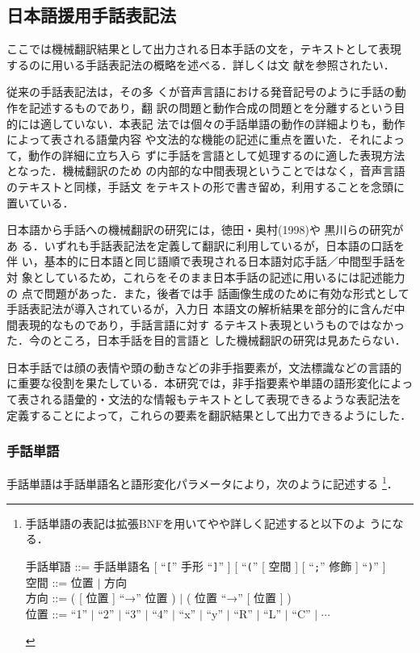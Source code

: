 \documentclass[japanese]{jnlp_1.4}
\begin{document}
\subsection{日本語援用手話表記法}
\label{sec:notation}

ここでは機械翻訳結果として出力される日本手話の文を，テキストとして表現
するのに用いる手話表記法の概略を述べる．詳しくは文
献\cite{Matsumoto2006}を参照されたい．

従来の手話表記法\cite{Prillwitz2004,Sutton2002,Ichikawa2001}は，その多
くが音声言語における発音記号のように手話の動作を記述するものであり，翻
訳の問題と動作合成の問題とを分離するという目的には適していない．本表記
法では個々の手話単語の動作の詳細よりも，動作によって表される語彙内容
や文法的な機能の記述に重点を置いた．それによって，動作の詳細に立ち入ら
ずに手話を言語として処理するのに適した表現方法となった．機械翻訳のため
の内部的な中間表現ということではなく，音声言語のテキストと同様，手話文
をテキストの形で書き留め，利用することを念頭に置いている．

日本語から手話への機械翻訳の研究には，徳田・奥村(1998)\nocite{Tokuda1998}や
黒川ら\cite{Fujishige1997,Hirata2003,Ikeda2003,Miyashita2004}の研究があ
る．いずれも手話表記法を定義して翻訳に利用しているが，日本語の口話を伴
い，基本的に日本語と同じ語順で表現される日本語対応手話／中間型手話を対
象としているため，これらをそのまま日本手話の記述に用いるには記述能力の
点で問題があった\cite{Matsumoto2006}．また，後者\cite{Ikeda2003}では手
話画像生成のために有効な形式として手話表記法が導入されているが，入力日
本語文の解析結果を部分的に含んだ中間表現的なものであり，手話言語に対す
るテキスト表現というものではなかった．今のところ，日本手話を目的言語と
した機械翻訳の研究は見あたらない．

日本手話では顔の表情や頭の動きなどの非手指要素が，文法標識などの言語的
に重要な役割を果たしている．本研究では，非手指要素や単語の語形変化によっ
て表される語彙的・文法的な情報もテキストとして表現できるような表記法を
定義することによって，これらの要素を翻訳結果として出力できるようにした．



\subsubsection{手話単語}

手話単語は手話単語名と語形変化パラメータにより，次のように記述する
\footnote{手話単語の表記は拡張BNFを用いてやや詳しく記述すると以下のよ
  うになる．
   \\
  \begin{minipage}{1.0\linewidth}
\begin{tabbing}
\qquad\qquad  手話\=単語 ::= 手話単語名 [ ``\texttt{[}'' 手形 ``\texttt{]}'' ] [
``\texttt{(}'' [ 空間 ] [ ``\texttt{;}'' 修飾 ] ``\texttt{)}'' ] \\
\> 空間  ::= 位置 $\mid$ 方向 \\
\> 方向  ::= ( [ 位置 ] ``→''  位置 ) $\mid$ ( 位置 ``→'' [ 位置 ]
) \\
\> 位置  ::= ``1'' $\mid$ ``2'' $\mid$ ``3'' $\mid$ ``4'' $\mid$ ``x'' $\mid$ ``y'' $\mid$ ``R'' $\mid$
``L'' $\mid$ ``C'' $\mid$ $\cdots$
\end{tabbing}
  \end{minipage}
}．
\end{document}
